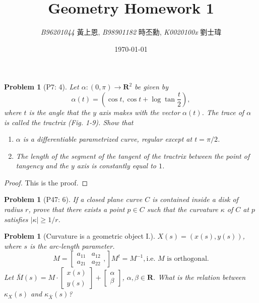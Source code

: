 \documentclass[12pt,a4paper]{article}
\newcounter{theProblemCounter}
\newtheorem{problem}[theProblemCounter]{Problem}
\begin{document}
\title{Geometry Homework 1}
\author{{\it{B96201044}} 黃上恩, {\it{B98901182}} 時丕勳, {\it{K0020100x}} 劉士瑋}
\date{\today}
\maketitle

\setcounter{theProblemCounter}{2}
\begin{problem}[P7: 4]
Let $\alpha:(0, \pi)\to \mathbf{R}^2$ be given by
\[ \alpha(t) = \left(\cos t, \cos t + \log\tan\frac{t}{2}\right),\]
where $t$ is the angle that the $y$ axis makes with the vector $\alpha(t)$. The trace of $\alpha$ is called the \emph{tractrix} (Fig. 1-9). Show that
\begin{enumerate}
\item[(a)] $\alpha$ is a differentiable parametrized curve, regular except at $t=\pi/2$.
\item[(b)] The length of the segment of the tangent of the tractrix between the point of tangency and the $y$ axis is constantly equal to $1$.
\end{enumerate}
\end{problem}

\begin{proof}
This is the proof.
\end{proof}

\setcounter{theProblemCounter}{4}
\begin{problem}[P47: 6]
If a closed plane curve $C$ is contained inside a disk of radius $r$, prove that there exists a point $p\in C$ such that the curvature $\kappa$ of $C$ at $p$ satisfies $|\kappa|\ge 1/r$.
\end{problem}

\setcounter{theProblemCounter}{7}
\begin{problem}[Curvature is a geometric object I.]
$X(s)=(x(s), y(s))$, where $s$ is the arc-length parameter.
\[ M = \left[
\begin{array}{cc} a_{11} & a_{12} \\ a_{21} & a_{22} \end{array},
\right]
M^t = M^{-1}, \mbox{i.e. $M$ is orthogonal.}
\]
Let $\bar{M}(s) = M\cdot \left[\begin{array}{c} x(s)\\y(s)\end{array}\right] + \left[\begin{array}{c}\alpha \\ \beta\end{array}\right]$,  $\alpha, \beta\in \mathbf{R}$. What is the relation between $\kappa_X(s)$ and $\kappa_{\bar{X}}(s)$?
\end{problem}
\end{document}

